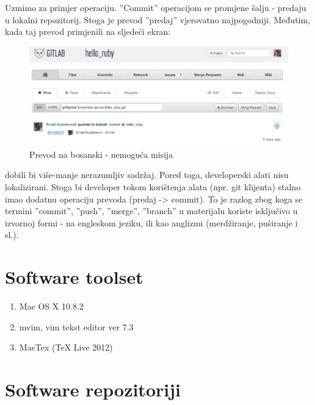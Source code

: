 \documentclass[times, utf8, seminar]{fit}
\begin{document}
\begin{itemize}
Uzmimo za primjer \href{http://translate.google.com/#en/hr/commit}{\color{blue}{''commit''}} operaciju.
''Commit'' operacijom se promjene šalju - predaju u lokalni repozitorij.
Stoga je prevod ''predaj'' vjerovatno najpogodniji. Međutim, kada taj prevod primjenili na sljedeći ekran:

\begin{figure}[H]
\centering
\includegraphics[width=14cm]{img/cik_prevedi.png}
\caption{Prevod na bosanski - nemoguća misija}
\end{figure}

dobili bi više-manje nerazumljiv sadržaj. Pored toga, developerski alati nisu lokalizirani. Stoga bi developer tokom korištenja alata (npr. git klijenta) stalno imao dodatnu operaciju prevoda (predaj -> commit). To je razlog zbog koga se termini ''commit'', ''push'', ''merge'', ''branch'' u materijalu koriste isključivo u izvornoj formi - na engleskom jeziku, ili kao anglizmi (merdžiranje, puširanje i sl.).

\chapter{Software toolset}
\begin{enumerate}
  \item Mac OS X 10.8.2
  \item mvim, vim tekst editor ver 7.3
  \item MacTex (TeX Live 2012)
\end{enumerate}

\chapter{Software repozitoriji}


\end{itemize}
\end{document}
